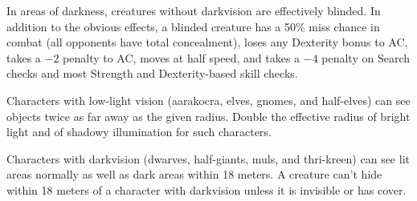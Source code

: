 In areas of darkness, creatures without darkvision are effectively blinded. In addition to the obvious effects, a blinded creature has a 50\% miss chance in combat (all opponents have total concealment), loses any Dexterity bonus to AC, takes a $-2$ penalty to AC, moves at half speed, and takes a $-4$ penalty on Search checks and most Strength and Dexterity-based skill checks.

Characters with low-light vision (aarakocra, elves, gnomes, and half-elves) can see objects twice as far away as the given radius. Double the effective radius of bright light and of shadowy illumination for such characters.

Characters with darkvision (dwarves, half-giants, muls, and thri-kreen) can see lit areas normally as well as dark areas within 18 meters. A creature can't hide within 18 meters of a character with darkvision unless it is invisible or has cover.